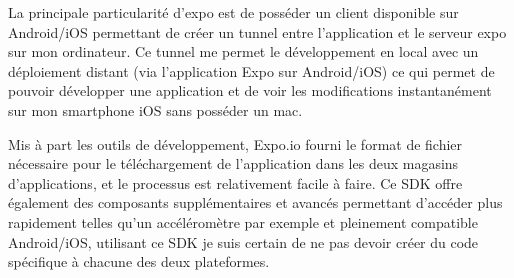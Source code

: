 La principale particularité d'expo est de posséder un client disponible sur Android/iOS permettant de créer un tunnel entre l'application et le serveur expo sur mon ordinateur. Ce tunnel me permet le développement en local avec un déploiement distant (via l’application Expo sur Android/iOS) ce qui permet de pouvoir développer une application et de voir les modifications instantanément sur mon smartphone iOS sans posséder un mac. 

Mis à part les outils de développement, Expo.io fourni le format de fichier nécessaire pour le téléchargement de l’application dans les deux magasins d'applications, et le processus est relativement facile à faire. Ce SDK offre également des composants supplémentaires et avancés permettant d'accéder plus rapidement telles qu'un accéléromètre par exemple et pleinement compatible Android/iOS, utilisant ce SDK je suis certain de ne pas devoir créer du code spécifique à chacune des deux plateformes.




